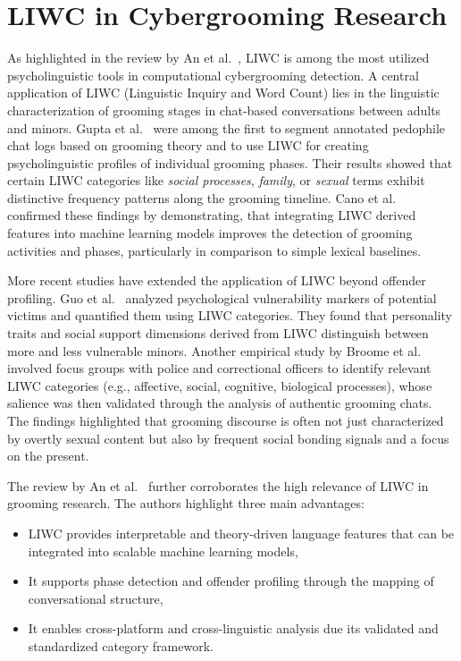 \section{LIWC in Cybergrooming Research}
 As highlighted in the review by An et al.~\cite{an2025cybergrooming}, LIWC is among the most utilized psycholinguistic tools in computational cybergrooming detection. 
 A central application of LIWC (Linguistic Inquiry and Word Count) lies in the linguistic characterization of grooming stages in chat-based conversations between adults and minors. Gupta et al.~\cite{gupta2012characterizingpedophileconversationsinternet} were among the first to segment annotated pedophile chat logs based on grooming theory and to use LIWC for creating psycholinguistic profiles of individual grooming phases. Their results showed that certain LIWC categories like \textit{social processes}, \textit{family}, or \textit{sexual} terms exhibit distinctive frequency patterns along the grooming timeline. Cano et al.~\cite{Cano2014} confirmed these findings by demonstrating, that integrating LIWC derived features into machine learning models improves the detection of grooming activities and phases, particularly in comparison to simple lexical baselines. %

More recent studies have extended the application of LIWC beyond offender profiling. Guo et al.~\cite{guo2023text} analyzed psychological vulnerability markers of potential victims and quantified them using LIWC categories. %
 They found that personality traits and social support dimensions derived from LIWC distinguish between more and less vulnerable minors.  %
 Another empirical study by Broome et al.~\cite{broome2020psycholinguistic} involved focus groups with police and correctional officers to identify relevant LIWC categories (e.g., affective, social, cognitive, biological processes), whose salience was then validated through the analysis of authentic grooming chats. The findings highlighted that grooming discourse is often not just characterized by overtly sexual content but also by frequent social bonding signals and a focus on the present. %

The review by An et al.~\cite{an2025cybergrooming} further corroborates the high relevance of LIWC in grooming research. The authors highlight three main advantages:
\begin{itemize}
    \item LIWC provides interpretable and theory-driven language features that can be integrated into scalable machine learning models,
    \item It supports phase detection and offender profiling through the mapping of conversational structure,
    \item It enables cross-platform and cross-linguistic analysis due its validated and standardized category framework.
\end{itemize} %

